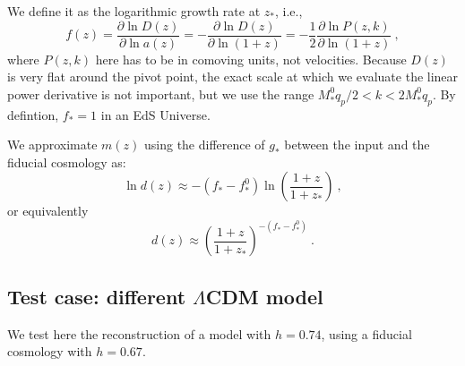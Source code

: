 We define it as the logarithmic growth rate at $z_\ast$, i.e.,
\begin{equation}
 f(z) = \frac{\partial \ln D(z)}{\partial \ln a(z)}
  = - \frac{\partial \ln D(z)}{\partial \ln (1+z)}
  = - \frac{1}{2} \frac{\partial \ln P(z,k)}{\partial \ln (1+z)} ~,
\end{equation}
where $P(z,k)$ here has to be in comoving units, not velocities.
Because $D(z)$ is very flat around the pivot point, the exact scale at which
we evaluate the linear power derivative is not important, but we use the
range $ M_\ast^0 q_p /2 < k < 2 M_\ast^0 q_p$.
By defintion, $f_\ast=1$ in an EdS Universe.

We approximate $m(z)$ using the difference of $g_\ast$ between the input
and the fiducial cosmology as:
\begin{equation}
 \ln d(z) \approx - \left( f_\ast - f^0_\ast \right) 
    \ln \left( \frac{1+z}{1+z_\ast} \right) ~,
\end{equation}
or equivalently
\begin{equation}
 d(z) \approx \left( \frac{1+z}{1+z_\ast} \right)^{- ( f_\ast - f^0_\ast)} ~.
\end{equation}


\subsection{Test case: different $\Lambda$CDM model}

We test here the reconstruction of a model with $h=0.74$, using a fiducial
cosmology with $h=0.67$.

